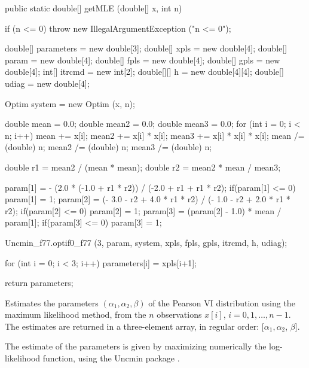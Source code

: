 \begin{code}

   public static double[] getMLE (double[] x, int n)\begin{hide} {
      if (n <= 0)
         throw new IllegalArgumentException ("n <= 0");

      double[] parameters = new double[3];
      double[] xpls = new double[4];
      double[] param = new double[4];
      double[] fpls = new double[4];
      double[] gpls = new double[4];
      int[] itrcmd = new int[2];
      double[][] h = new double[4][4];
      double[] udiag = new double[4];

      Optim system = new Optim (x, n);

      double mean = 0.0;
      double mean2 = 0.0;
      double mean3 = 0.0;
      for (int i = 0; i < n; i++)
      {
         mean += x[i];
         mean2 += x[i] * x[i];
         mean3 += x[i] * x[i] * x[i];
      }
      mean /= (double) n;
      mean2 /= (double) n;
      mean3 /= (double) n;

      double r1 = mean2 / (mean * mean);
      double r2 = mean2 * mean / mean3;

      param[1] = - (2.0 * (-1.0 + r1 * r2)) / (-2.0 + r1 + r1 * r2);
      if(param[1] <= 0) param[1] = 1;
      param[2] = (- 3.0 - r2 + 4.0 * r1 * r2) / (- 1.0 - r2 + 2.0 * r1 * r2);
      if(param[2] <= 0) param[2] = 1;
      param[3] = (param[2] - 1.0) * mean / param[1];
      if(param[3] <= 0) param[3] = 1;

      Uncmin_f77.optif0_f77 (3, param, system, xpls, fpls, gpls, itrcmd, h, udiag);

      for (int i = 0; i < 3; i++)
         parameters[i] = xpls[i+1];

      return parameters;
   }\end{hide}
\end{code}
\begin{tabb}
    Estimates the parameters $(\alpha_1,\alpha_2,\beta)$ of the Pearson VI distribution
    using the maximum likelihood method, from the $n$ observations
   $x[i]$, $i = 0, 1,\ldots, n-1$. The estimates are returned in a three-element
    array, in regular order: [$\alpha_1, \alpha_2$, $\beta$].
   \begin{detailed}
   The estimate of the parameters is given by maximizing numerically the
   log-likelihood function, using the Uncmin package \cite{iSCHa,iVERa}.
   \end{detailed}
\end{tabb}
\begin{htmlonly}
\end{htmlonly}
